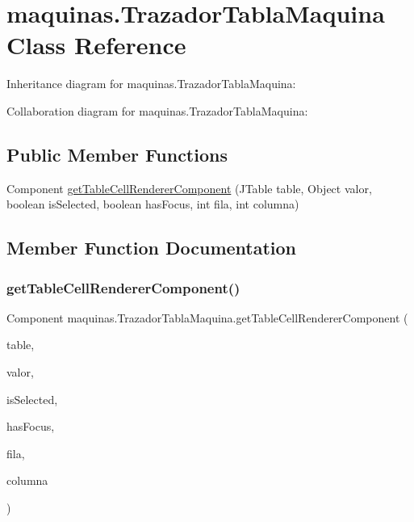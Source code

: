 \hypertarget{classmaquinas_1_1_trazador_tabla_maquina}{}\section{maquinas.\+Trazador\+Tabla\+Maquina Class Reference}
\label{classmaquinas_1_1_trazador_tabla_maquina}


Inheritance diagram for maquinas.\+Trazador\+Tabla\+Maquina\+:


Collaboration diagram for maquinas.\+Trazador\+Tabla\+Maquina\+:
\subsection*{Public Member Functions}
\begin{DoxyCompactItemize}
\item 
Component \mbox{\hyperlink{classmaquinas_1_1_trazador_tabla_maquina_af06b2906b95905c50f88f0bf43d72519}{get\+Table\+Cell\+Renderer\+Component}} (J\+Table table, Object valor, boolean is\+Selected, boolean has\+Focus, int fila, int columna)
\end{DoxyCompactItemize}


\subsection{Member Function Documentation}
\mbox{\label{classmaquinas_1_1_trazador_tabla_maquina_af06b2906b95905c50f88f0bf43d72519}} 
\subsubsection{\texorpdfstring{get\+Table\+Cell\+Renderer\+Component()}{getTableCellRendererComponent()}}
{\footnotesize\ttfamily Component maquinas.\+Trazador\+Tabla\+Maquina.\+get\+Table\+Cell\+Renderer\+Component (\begin{DoxyParamCaption}\item[{J\+Table}]{table,  }\item[{Object}]{valor,  }\item[{boolean}]{is\+Selected,  }\item[{boolean}]{has\+Focus,  }\item[{int}]{fila,  }\item[{int}]{columna }\end{DoxyParamCaption})\hspace{0.3cm}{\ttfamily [inline]}}

